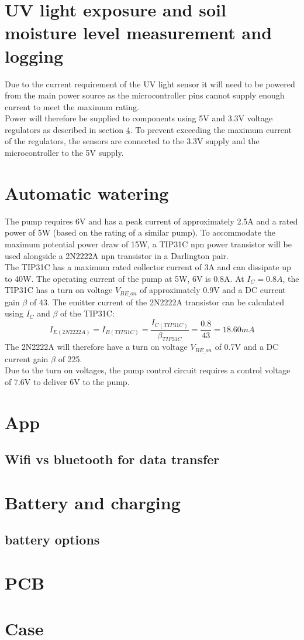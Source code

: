\section{UV light exposure and soil moisture level measurement and logging}
Due to the current requirement of the UV light sensor it will need to be powered from the main power source as the microcontroller pins cannot supply enough current to meet the maximum rating. 
\\
Power will therefore be supplied to components using 5V and 3.3V voltage regulators as described in section \ref{sec:battery}. To prevent exceeding the maximum current of the regulators, the sensors are connected to the 3.3V supply and the microcontroller to the 5V supply. 

\section{Automatic watering}
The pump requires 6V and has a peak current of approximately 2.5A and a rated power of 5W (based on the rating of a similar pump). To accommodate the maximum potential power draw of 15W, a TIP31C npn power transistor will be used alongside a 2N2222A npn transistor in a Darlington pair. 
\\
The TIP31C has a maximum rated collector current of 3A and can dissipate up to 40W. The operating current of the pump at 5W, 6V is 0.8A. At \(I_C = 0.8A\), the TIP31C has a turn on voltage \(V_{BE\_on}\) of approximately 0.9V and a DC current gain \(\beta\) of 43. The emitter current of the 2N2222A transistor can be calculated using \(I_C\) and \(\beta\) of the TIP31C: 
\[I_{E(2N2222A)} = I_{B(TIP31C)} = \frac{I_{C(TIP31C)}}{\beta_{TIP31C}} = \frac{0.8}{43} = 18.60mA\]
The 2N2222A will therefore have a turn on voltage \(V_{BE\_on}\) of 0.7V and a DC current gain \(\beta\) of 225. 
\\

Due to the turn on voltages, the pump control circuit requires a control voltage of 7.6V to deliver 6V to the pump. 
\section{App}
\subsection{Wifi vs bluetooth for data transfer}

\section{Battery and charging}
\label{sec:battery}
\subsection{battery options}

\section{PCB}

\section{Case}
